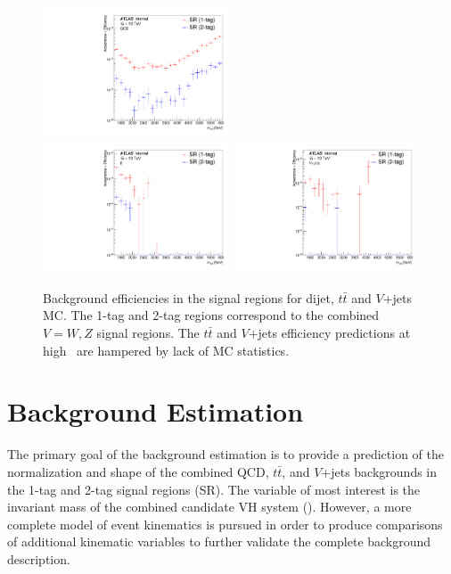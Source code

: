 \begin{figure}[htbp!]
\begin{center}
    \includegraphics[width=0.49\textwidth]{PlotVHqqbbBkgRejection_dijet.pdf} \\
    \includegraphics[width=0.49\textwidth]{PlotVHqqbbBkgRejection_ttbar.pdf}
    \includegraphics[width=0.49\textwidth]{PlotVHqqbbBkgRejection_vjets.pdf}
\end{center}
\caption{Background efficiencies in the signal regions for dijet, $t\bar{t}$ and $V$+jets MC. The 1-tag and 2-tag regions correspond to the combined $V=W,Z$ signal regions. The $t\bar{t}$ and $V$+jets efficiency predictions at high \mvh\ are hampered by lack of MC statistics.}
\label{fig:effBkg}
\end{figure}


\section{Background Estimation}
\label{sec:background}
The primary goal of the background estimation is to provide a prediction of the normalization and shape of the combined QCD, $t\bar{t}$, and $V$+jets backgrounds in the 1-tag and 2-tag signal regions (SR).
The variable of most interest is the invariant mass of the combined candidate VH system (\mvh).
However, a more complete model of event kinematics is pursued in order to produce comparisons of additional kinematic variables to further validate the complete background description.

